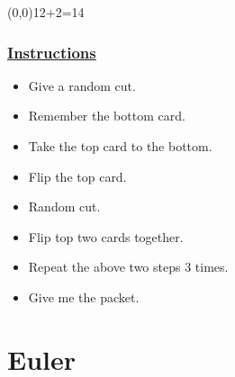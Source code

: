 \begin{frame}\begin{textblock}{1}(0,0)12+2=14\end{textblock}\frametitle{{\color{red}\underline{\Large\bf
}}}\frametitle{\underline{\Large\bf
Instructions}}

\begin{itemize}

\item Give a  random cut.
\item Remember the bottom card.
\item Take the top card to the bottom.
\item Flip the top card.
\item Random cut.
\item Flip top two cards together.
\item Repeat the above two steps $3$ times.
\item Give me the packet.

\end{itemize}

\end{frame}

\section{Euler}

